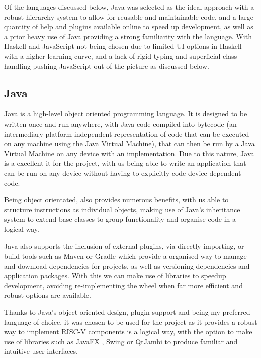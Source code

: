 Of the languages discussed below, Java was selected as the ideal approach with a robust hierarchy system to allow for reusable and maintainable code, and a large quantity of help and plugins available online to speed up development, as well as a prior heavy use of Java providing a strong familiarity with the language. With Haskell and JavaScript not being chosen due to limited \ac{UI} options in Haskell with a higher learning curve, and a lack of rigid typing and superficial class handling pushing JavaScript out of the picture as discussed below.

\subsection{Java}
Java \cite{sunmicrosystems_2022_java} is a high-level object oriented programming language. It is designed to be written once and run anywhere, with Java code compiled into bytecode (an intermediary platform independent representation of code that can be executed on any machine using the Java Virtual Machine), that can then be run by a Java Virtual Machine on any device with an implementation. Due to this nature, Java is a excellent it for the project, with us being able to write an application that can be run on any device without having to explicitly code device dependent code.

Being object orientated, also provides numerous benefits, with us able to structure instructions as individual objects, making use of Java's inheritance system to extend base classes to group functionality and organise code in a logical way.

Java also supports the inclusion of external plugins, via directly importing, or build tools such as Maven \cite{porter_2022_maven} or Gradle \cite{gradleinc_2023_gradle} which provide a organised way to manage and download dependencies for projects, as well as versioning dependencies and application packages. With this we can make use of libraries to speedup development, avoiding re-implementing the wheel when far more efficient and robust options are available.

Thanks to Java's object oriented design, plugin support and being my preferred language of choice, it was chosen to be used for the project as it provides a robust way to implement RISC-V components is a logical way, with the option to make use of libraries such as JavaFX \cite{sunmicrosystems_2022_javafx}, Swing \cite{oconner_2007_using} or QtJambi \cite{omixvisualization_2023_omixvisualizationqtjambi} to produce familiar and intuitive user interfaces.

